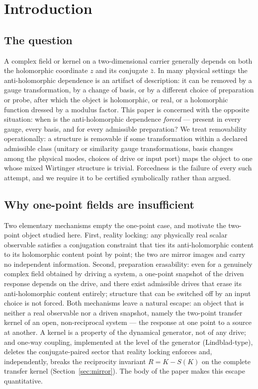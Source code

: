 \documentclass[11pt,a4paper]{article}
\newcommand{\zb}{\bar{z}}
\begin{document}
\section{Introduction}

\subsection{The question}

A complex field or kernel on a two-dimensional carrier generally depends on both
the holomorphic coordinate $z$ and its conjugate $\zb$. In many physical settings
the anti-holomorphic dependence is an artifact of description: it can be removed
by a gauge transformation, by a change of basis, or by a different choice of
preparation or probe, after which the object is holomorphic, or real, or a
holomorphic function dressed by a modulus factor. This paper is concerned with
the opposite situation: when is the anti-holomorphic dependence \emph{forced} ---
present in every gauge, every basis, and for every admissible preparation? We treat
removability operationally: a structure is removable if some transformation
within a declared admissible class (unitary or similarity gauge
transformations, basis changes among the physical modes, choices of drive or
input port) maps the object to one whose mixed Wirtinger structure is trivial.
Forcedness is the failure of every such attempt, and we require it to be
certified symbolically rather than argued.

\subsection{Why one-point fields are insufficient}

Two elementary mechanisms empty the one-point case, and motivate the two-point
object studied here. First, reality locking: any physically real scalar
observable satisfies a conjugation constraint that ties its anti-holomorphic
content to its holomorphic content point by point; the two are mirror images
and carry no independent information. Second, preparation erasability: even for
a genuinely complex field obtained by driving a system, a one-point snapshot of
the driven response depends on the drive, and there exist admissible drives
that erase its anti-holomorphic content entirely; structure that can be
switched off by an input choice is not forced. Both mechanisms leave a natural
escape: an object that is neither a real observable nor a driven snapshot,
namely the two-point transfer kernel of an open, non-reciprocal system --- the
response at one point to a source at another. A kernel is a property of the
dynamical generator, not of any drive; and one-way coupling, implemented at
the level of the generator (Lindblad-type), deletes the conjugate-paired
sector that reality locking enforces and, independently, breaks the
reciprocity invariant $R = K - S(K)$ on the complete transfer kernel
(Section~\ref{sec:mirror}). The body of the
paper makes this escape quantitative.
\end{document}
